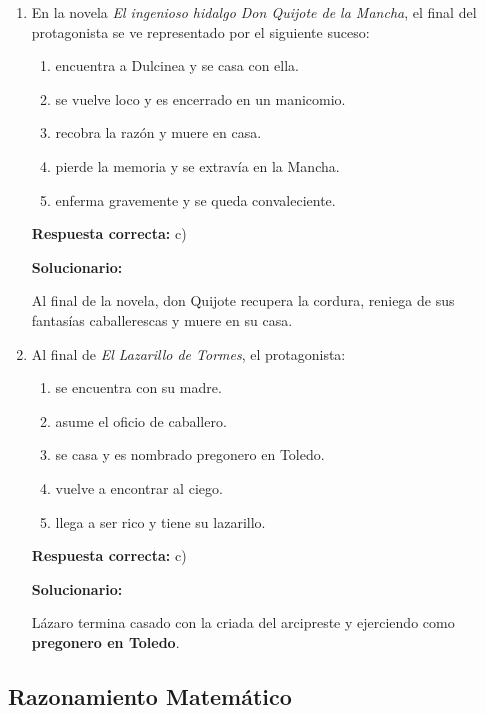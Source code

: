 \begin{enumerate}[resume]
	
	\vspace{6mm}
	
	\item En la novela \textit{El ingenioso hidalgo Don Quijote de la Mancha}, el final del protagonista se ve representado por el siguiente suceso:
	\begin{enumerate}[label=\alph*)]
		\item encuentra a Dulcinea y se casa con ella.
		\item se vuelve loco y es encerrado en un manicomio.
		\item recobra la razón y muere en casa.
		\item pierde la memoria y se extravía en la Mancha.
		\item enferma gravemente y se queda convaleciente.
	\end{enumerate}
	\textbf{Respuesta correcta:} c)
	
	\vspace{2mm}
	\textbf{Solucionario:}
	
	Al final de la novela, don Quijote recupera la cordura, reniega de sus fantasías caballerescas y muere en su casa.
	

	
	\vspace{6mm}
	
	\item Al final de \textit{El Lazarillo de Tormes}, el protagonista:
	\begin{enumerate}[label=\alph*)]
		\item se encuentra con su madre.
		\item asume el oficio de caballero.
		\item se casa y es nombrado pregonero en Toledo.
		\item vuelve a encontrar al ciego.
		\item llega a ser rico y tiene su lazarillo.
	\end{enumerate}
	\textbf{Respuesta correcta:} c)
	
	\vspace{2mm}
	\textbf{Solucionario:}
	
	Lázaro termina casado con la criada del arcipreste y ejerciendo como \textbf{pregonero en Toledo}.
	

	
	\vspace{6mm}
\end{enumerate}

\subsection*{Razonamiento Matemático}

